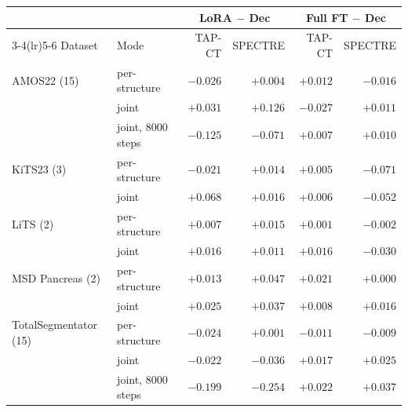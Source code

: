 \begin{tabular}{llrrrr}
\toprule
 & & \multicolumn{2}{c}{LoRA $-$ Dec} & \multicolumn{2}{c}{Full FT $-$ Dec} \\
\cmidrule(lr){3-4}\cmidrule(lr){5-6}
Dataset & Mode & TAP-CT & SPECTRE & TAP-CT & SPECTRE \\
\midrule
AMOS22 (15) & per-structure & $-0.026$ & $+0.004$ & $+0.012$ & $-0.016$ \\
 & joint & $+0.031$ & $+0.126$ & $-0.027$ & $+0.011$ \\
 & joint, 8000 steps & $-0.125$ & $-0.071$ & $+0.007$ & $+0.010$ \\
KiTS23 (3) & per-structure & $-0.021$ & $+0.014$ & $+0.005$ & $-0.071$ \\
 & joint & $+0.068$ & $+0.016$ & $+0.006$ & $-0.052$ \\
LiTS (2) & per-structure & $+0.007$ & $+0.015$ & $+0.001$ & $-0.002$ \\
 & joint & $+0.016$ & $+0.011$ & $+0.016$ & $-0.030$ \\
MSD Pancreas (2) & per-structure & $+0.013$ & $+0.047$ & $+0.021$ & $+0.000$ \\
 & joint & $+0.025$ & $+0.037$ & $+0.008$ & $+0.016$ \\
TotalSegmentator (15) & per-structure & $-0.024$ & $+0.001$ & $-0.011$ & $-0.009$ \\
 & joint & $-0.022$ & $-0.036$ & $+0.017$ & $+0.025$ \\
 & joint, 8000 steps & $-0.199$ & $-0.254$ & $+0.022$ & $+0.037$ \\
\bottomrule
\end{tabular}
